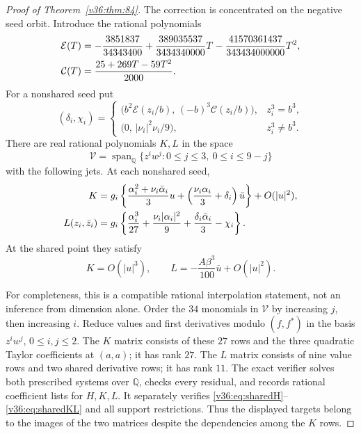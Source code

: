 \documentclass[UTF8,11pt]{ctexart}
\theoremstyle{definition}
\numberwithin{equation}{section}
\begin{document}
\begin{proof}[Proof of Theorem~\ref{v36:thm:84}]
The correction is concentrated on the negative seed orbit.
Introduce the rational polynomials
\begin{align}
 \mathcal E(T)&=-\frac{3851837}{34343400}
       +\frac{389035537}{3434340000}T
       -\frac{41570361437}{343434000000}T^2,\notag\\
 \mathcal C(T)&=\frac{25+269T-59T^2}{2000}.
                                             \label{v36:eq:EC}
\end{align}
For a nonshared seed put
\[
 (\delta_i,\chi_i)=
 \begin{cases}
 \bigl(b^2\mathcal E(z_i/b),\,(-b)^3\mathcal C(z_i/b)\bigr),
                                  &z_i^3=b^3,\\
 \bigl(0,\,|\nu_i|^2\nu_i/9\bigr),&z_i^3\ne b^3.
 \end{cases}
\]
There are real rational polynomials $K,L$ in the space
\[
 \mathcal V=\operatorname{span}_{\mathbb Q}
       \{z^iw^j:0\le j\le3,\ 0\le i\le9-j\}
\]
with the following jets. At each nonshared seed,
\begin{align}
 K={}&g_i\left\{
       \frac{\alpha_i^2+\nu_i\bar\alpha_i}{3}u
       +\left(\frac{\nu_i\alpha_i}{3}+\delta_i\right)\bar u
       \right\}+O(|u|^2),\notag\\
 L(z_i,\bar z_i)={}&g_i\left\{
       \frac{\alpha_i^3}{27}+\frac{\nu_i|\alpha_i|^2}{9}
       +\frac{\delta_i\bar\alpha_i}{3}-\chi_i\right\}.
                                                   \label{v36:eq:jets}
\end{align}
At the shared point they satisfy
\begin{equation}\label{v36:eq:sharedKL}
       K=O(|u|^3),\qquad
       L=-\frac{A\beta^3}{100}\bar u+O(|u|^2).
\end{equation}

For completeness, this is a compatible rational interpolation
statement, not an inference from dimension alone. Order the
$34$ monomials in $\mathcal V$ by increasing $j$, then increasing
$i$. Reduce values and first derivatives modulo $(f,f^*)$ in
the basis $z^iw^j$, $0\le i,j\le2$. The $K$ matrix consists
of these $27$ rows and the three quadratic Taylor coefficients
at $(a,a)$; it has rank $27$. The $L$ matrix consists of nine
value rows and two shared derivative rows; it has rank $11$.
The exact verifier solves both prescribed systems over
$\mathbb Q$, checks every residual, and records rational
coefficient lists for $H,K,L$. It separately verifies
\eqref{v36:eq:sharedH}--\eqref{v36:eq:sharedKL} and all support
restrictions. Thus the displayed targets belong to the images
of the two matrices despite the dependencies among the $K$ rows.


\end{proof}
\end{document}
